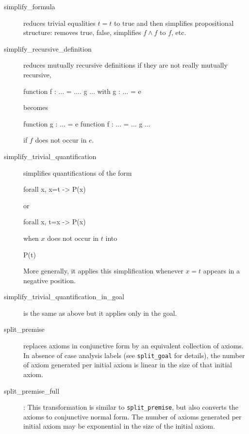 \begin{description}
\item[simplify\_formula] reduces trivial equalities $t=t$ to true and
  then simplifies propositional structure: removes true, false, simplifies
  $f \land f$ to $f$, etc.

\item[simplify\_recursive\_definition] reduces mutually recursive
  definitions if they are not really mutually recursive, \eg
\begin{whycode}
function f : ... = .... g ...
with g : ... = e
\end{whycode}
becomes
\begin{whycode}
function g : ... = e
function f : ... = ... g ...
\end{whycode}
if $f$ does not occur in $e$.

\item[simplify\_trivial\_quantification]
  simplifies quantifications of the form
\begin{whycode}
forall x, x=t -> P(x)
\end{whycode}
or
\begin{whycode}
forall x, t=x -> P(x)
\end{whycode}
when $x$ does not occur in $t$ into
\begin{whycode}
P(t)
\end{whycode}
  More generally, it applies this simplification whenever $x=t$ appears
  in a negative position.

\item[simplify\_trivial\_quantification\_in\_goal]
  is the same as above but it applies only in the goal.

\item[split\_premise] replaces axioms in conjunctive form
  by an equivalent collection of axioms.
  In absence of case analysis labels (see \texttt{split\_goal} for details),
  the number of axiom generated per initial axiom is
  linear in the size of that initial axiom.

\item[split\_premise\_full]: This transformation is similar to \texttt{split\_premise}, but also converts the axioms to conjunctive normal form. The number of axioms generated per initial axiom may be exponential in the size of the initial axiom.

\end{description}

